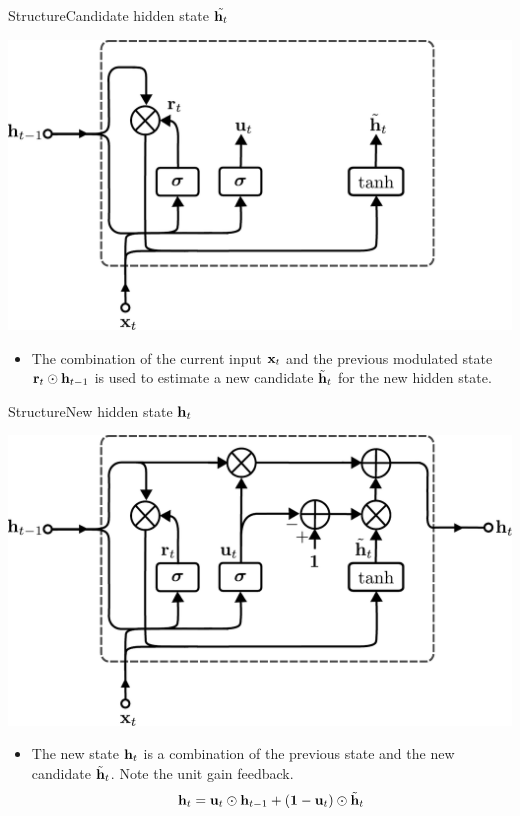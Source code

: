 \documentclass{beamer}
\begin{document}
\begin{frame}{Structure}{Candidate hidden state $\tilde{{\bf h}_t}$}
\begin{center}
    \includegraphics[scale=0.4]{Module 5 (RNN)/pics/GRU_candidate_hidden_state.pdf}
\end{center}

\begin{itemize} 
\item The combination of the current input ${\bf x}_t$ and the previous modulated state ${\bf r}_t \odot {\bf h}_{t-1}$ is  used to estimate a new candidate $\tilde{{\bf h}}_t$ for the new hidden state.
\end{itemize}
\end{frame}

\begin{frame}{Structure}{New hidden state ${\bf h}_t$}
\begin{center}
    \includegraphics[scale=0.4]{Module 5 (RNN)/pics/gate_recurrent_unit.pdf}
\end{center}

\begin{itemize} 
\item The new state ${\bf h}_t$ is a combination of the previous state and the new candidate $\tilde{{\bf h}}_t$. Note the unit gain feedback. 
\begin{equation}
    {\bf h}_t = {\bf u}_t \odot {\bf h}_{t-1} + \left({\bf 1} - {\bf u}_t \right) \odot \tilde{{\bf h}}_t
\end{equation}
\end{itemize}
\end{frame}
\end{document}
